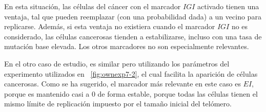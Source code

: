 En esta situación,
las células del cáncer con el marcador $IGI$ activado tienen una ventaja,
tal que pueden reemplazar (con una probabilidad dada) a un vecino para replicarse.
Además, si esta ventaja no existiera cuando el marcador $IGI$ no es considerado, las células
cancerosas tienden a estabilizarse, incluso con una tasa de mutación base elevada.
Los otros marcadores no son especialmente relevantes.

En el otro caso de estudio, es similar pero utilizando los parámetros del experimento utilizados en ~\ref{fig:ownexp7-2},
el cual facilita la aparición de células cancerosas. Como se ha sugerido, el marcador más relevante en este caso
es $EI$, porque es mantenido casi a $0$ de forma estable, porque todas las células tienen el mismo límite de replicación
impuesto por el tamaño inicial del telómero.
